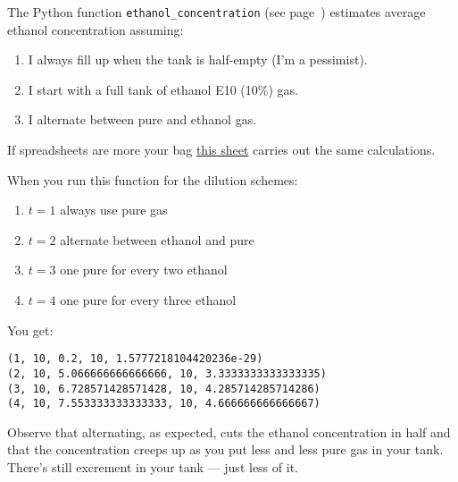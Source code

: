 The Python function \texttt{ethanol\_concentration}  (see page~\pageref{src:eegt7721}) estimates average ethanol concentration
assuming:

\begin{enumerate}
\def\labelenumi{\arabic{enumi}.}
\tightlist
\item
  I always fill up when the tank is half-empty (I'm a pessimist).
\item
  I start with a full tank of ethanol E10 (10\%) gas.
\item
  I alternate between pure and ethanol gas.
\end{enumerate}

If spreadsheets are more your bag \href{https://bakerjd99.files.wordpress.com/2023/01/eigt.xlsx}{this sheet} carries out the same
calculations. 

When you run this function for the dilution schemes:

\begin{enumerate}
\def\labelenumi{\arabic{enumi}.}
\tightlist
\item $t = 1$  always use pure gas
\item $t = 2$  alternate between ethanol and pure
\item $t = 3$  one pure for every two ethanol
\item $t = 4$  one pure for every three ethanol
\end{enumerate}

\begin{Shaded}
\begin{Highlighting}[]
\OperatorTok{=}   
\OperatorTok{=}    
 \NormalTok{(}\NormalTok{):}
    \OperatorTok{+}\NormalTok{))}
\end{Highlighting}
\end{Shaded}

You get:

\begin{verbatim}
(1, 10, 0.2, 10, 1.5777218104420236e-29)
(2, 10, 5.066666666666666, 10, 3.3333333333333335)
(3, 10, 6.728571428571428, 10, 4.285714285714286)
(4, 10, 7.553333333333333, 10, 4.666666666666667)
\end{verbatim}

Observe that alternating, as expected, cuts the ethanol concentration in
half and that the concentration creeps up as you put less and less pure
gas in your tank. There's still excrement in your tank --- just less of
it.

